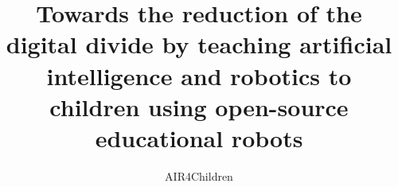 \documentclass[sigconf]{acmart}
\begin{document}
\title{Towards the reduction of the digital divide by teaching artificial intelligence and robotics to children using open-source educational robots} %



\author{AIR4Children}
\authornotemark[1]











\renewcommand{\shortauthors}{AIR4Children}
\end{document}
